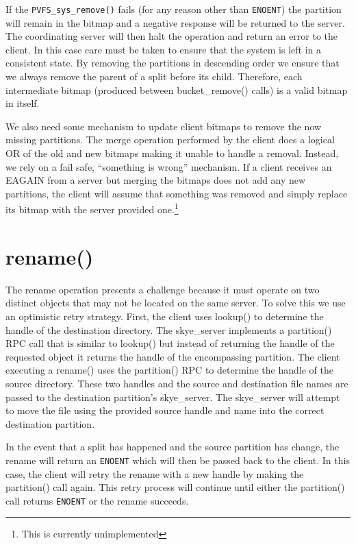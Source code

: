 \documentclass[letterpaper]{article}
\newcommand{\code}[1]{\texttt{#1}}
\begin{document}
If the \code{PVFS\_\-sys\_\-remove()} fails (for any reason other than \code{ENOENT}) the partition
will remain in the bitmap and a negative response will be returned to the
server.  The coordinating server will then halt the operation and return an
error to the client.  In this case care must be taken to ensure that the system
is left in a consistent state.  By removing the partitions in descending order
we ensure that we always remove the parent of a split before its child.
Therefore, each intermediate bitmap (produced between bucket\_\-remove() calls) is
a valid bitmap in itself.

We also need some mechanism to update client bitmaps to remove the now missing
partitions.  The merge operation performed by the client does a logical
OR of the old and new bitmaps making it unable to handle a removal.  Instead, we
rely on a fail safe, ``something is wrong'' mechanism.  If a client receives an
EAGAIN from a server but merging the bitmaps does not add any new partitions,
the client will assume that something was removed and simply replace its bitmap
with the server provided one.\footnote{This is currently unimplemented}

\section{rename()}
The rename operation presents a challenge because it must operate on two distinct
objects that may not be located on the same server.  To solve this we use an
optimistic retry strategy.  First, the client uses lookup() to determine the
handle of the destination directory.  The skye\_\-server implements a partition()
RPC call that is similar to lookup() but instead of returning the handle of the
requested object it returns the handle of the encompassing partition.  The
client executing a rename() uses the partition() RPC to determine the handle of
the source directory.  These two handles and the source and destination file
names are passed to the destination partition's skye\_\-server.  The skye\_\-server
will attempt to move the file using the provided source handle and name into the
correct destination partition.  

In the event that a split has happened and the source partition has change, the
rename will return an \code{ENOENT} which will then be passed back to the client.  In
this case, the client will retry the rename with a new handle by making the
partition() call again.  This retry process will continue until either the
partition() call returns \code{ENOENT} or the rename succeeds.  
\end{document}
